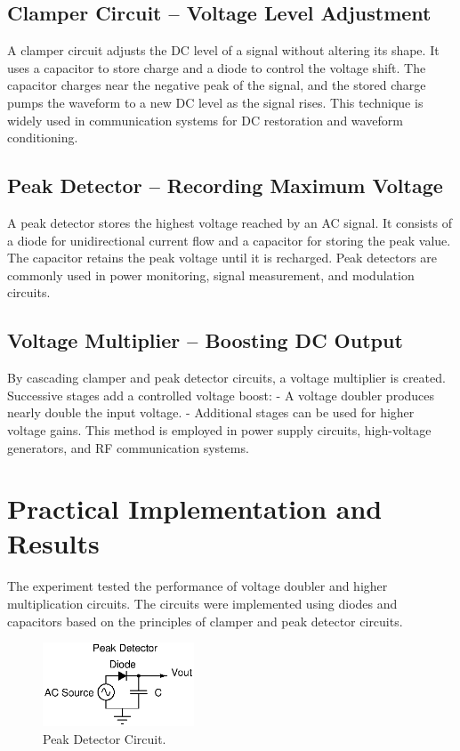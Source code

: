\documentclass[9pt,conference]{IEEEtran}
\begin{document}
\subsection{Clamper Circuit – Voltage Level Adjustment}
A clamper circuit adjusts the DC level of a signal without altering its shape. It uses a capacitor to store charge and a diode to control the voltage shift. The capacitor charges near the negative peak of the signal, and the stored charge pumps the waveform to a new DC level as the signal rises. This technique is widely used in communication systems for DC restoration and waveform conditioning.

\subsection{Peak Detector – Recording Maximum Voltage}
A peak detector stores the highest voltage reached by an AC signal. It consists of a diode for unidirectional current flow and a capacitor for storing the peak value. The capacitor retains the peak voltage until it is recharged. Peak detectors are commonly used in power monitoring, signal measurement, and modulation circuits.

\subsection{Voltage Multiplier – Boosting DC Output}
By cascading clamper and peak detector circuits, a voltage multiplier is created. Successive stages add a controlled voltage boost:
- A voltage doubler produces nearly double the input voltage.
- Additional stages can be used for higher voltage gains.
This method is employed in power supply circuits, high-voltage generators, and RF communication systems.

\section{Practical Implementation and Results}
The experiment tested the performance of voltage doubler and higher multiplication circuits. The circuits were implemented using diodes and capacitors based on the principles of clamper and peak detector circuits. 

\begin{figure}[H]
\centering
\includegraphics[width=0.4\textwidth]{peak_det_ckt_pos.eps}
\caption{\label{fig:peak_detector}Peak Detector Circuit.}
\end{figure}
\end{document}

